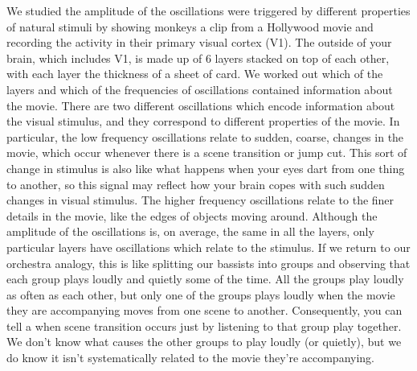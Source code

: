 We studied the amplitude of the oscillations were triggered by different properties of natural stimuli by showing monkeys a clip from a Hollywood movie and recording the activity in their primary visual cortex (\acs{V1}).
The outside of your brain, which includes \acs{V1}, is made up of \num{6} layers stacked on top of each other, with each layer the thickness of a sheet of card.
We worked out which of the layers and which of the frequencies of oscillations contained information about the movie.
There are two different oscillations which encode information about the visual stimulus, and they correspond to different properties of the movie.
In particular, the low frequency oscillations relate to sudden, coarse, changes in the movie, which occur whenever there is a scene transition or jump cut.
This sort of change in stimulus is also like what happens when your eyes dart from one thing to another, so this signal may reflect how your brain copes with such sudden changes in visual stimulus.
The higher frequency oscillations relate to the finer details in the movie, like the edges of objects moving around.
Although the amplitude of the oscillations is, on average, the same in all the layers, only particular layers have oscillations which relate to the stimulus.
If we return to our orchestra analogy, this is like splitting our bassists into groups and observing that each group plays loudly and quietly some of the time.
All the groups play loudly as often as each other, but only one of the groups plays loudly when the movie they are accompanying moves from one scene to another.
Consequently, you can tell a when scene transition occurs just by listening to that group play together.
We don't know what causes the other groups to play loudly (or quietly), but we do know it isn't systematically related to the movie they're accompanying.

\endgroup
